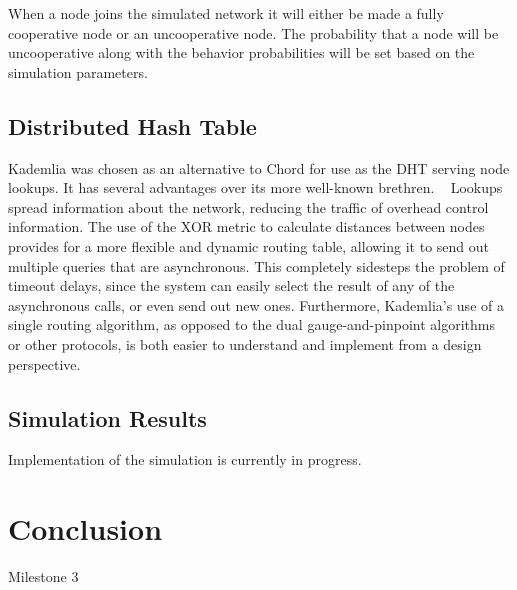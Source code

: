 \documentclass[%
				10pt,
        final,
        notitlepage,
        narroweqnarray,
        inline,
        twoside,
        ]{ieee}
\begin{document}
When a node joins the simulated network it will either be made a fully cooperative node or an uncooperative node.  The probability that a node will be uncooperative along with the behavior probabilities will be set based on the simulation parameters.

\subsection{Distributed Hash Table}
Kademlia was chosen as an alternative to Chord for use as the DHT serving node 
lookups.  It has several advantages over its more well-known brethren. 
~\cite{maymounkov} Lookups spread information about the network, reducing the 
traffic of overhead control information.  The use of the XOR metric to 
calculate distances between nodes provides for a more flexible and dynamic 
routing table, allowing it to send out multiple queries that are asynchronous.  
This completely sidesteps the problem of timeout delays, since the system can 
easily select the result of any of the asynchronous calls, or even send out new 
ones.  Furthermore, Kademlia's use of a single routing algorithm, as opposed to 
the dual gauge-and-pinpoint algorithms or other protocols, is both easier to 
understand and implement from a design perspective.


\subsection{Simulation Results}
Implementation of the simulation is currently in progress.

\section{Conclusion}
Milestone 3

\newpage






\end{document}
